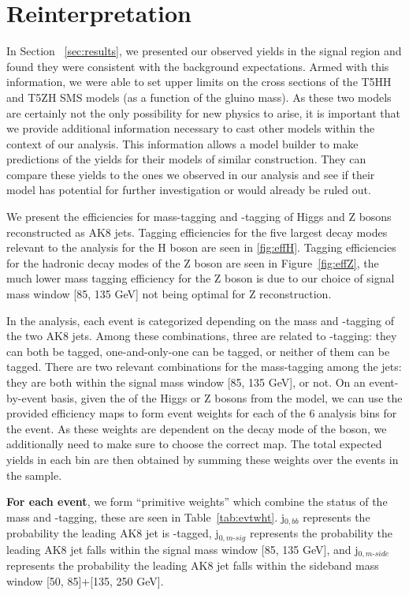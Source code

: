 \chapter{Reinterpretation}
\label{chap:reinterpretation}

In Section ~\ref{sec:results}, we presented our observed yields in the signal region and found they were consistent with the background expectations. Armed with this information, we were able to set upper limits on the cross sections of the T5HH and T5ZH SMS models (as a function of the gluino mass). As these two models are certainly not the only possibility for new physics to arise, it is important that we provide additional information necessary to cast other models within the context of our analysis. This information allows a model builder to make predictions of the yields for their models of similar construction. They can compare these yields to the ones we observed in our analysis and see if their model has potential for further investigation or would already be ruled out.

We present the efficiencies for mass-tagging and \bbbar-tagging of Higgs and Z bosons reconstructed as AK8 jets. Tagging efficiencies for the five largest decay modes relevant to the analysis for the H boson are seen in \ref{fig:effH}. Tagging efficiencies for the hadronic decay modes of the Z boson are seen in Figure~\ref{fig:effZ}, the much lower mass tagging efficiency for the Z boson is due to our choice of signal mass window [85, 135 GeV] not being optimal for Z reconstruction. 

In the analysis, each event is categorized depending on the mass and \bbbar-tagging of the two AK8 jets. Among these combinations, three are related to \bbbar-tagging: they can both be tagged, one-and-only-one can be tagged, or neither of them can be tagged. There are two relevant combinations for the mass-tagging among the jets: they are both within the signal mass window [85, 135 GeV], or not. On an event-by-event basis, given the \pt of the Higgs or Z bosons from the model, we can use the provided efficiency maps to form event weights for each of the 6 analysis bins for the event. As these weights are dependent on the decay mode of the boson, we additionally need to make sure to choose the correct map. The total expected yields in each bin are then obtained by summing these weights over the events in the sample.

\textbf{For each event}, we form ``primitive weights'' which combine the status of the mass and \bbbar-tagging, these are seen in Table~\ref{tab:evtwht}. j$_{0, bb}$ represents the probability the leading AK8 jet is \bbbar-tagged, j$_{0, m\text{-}sig}$ represents the probability the leading AK8 jet falls within the signal mass window [85, 135 GeV], and j$_{0, m\text{-}side}$ represents the probability the leading AK8 jet falls within the sideband mass window [50, 85]+[135, 250 GeV].


